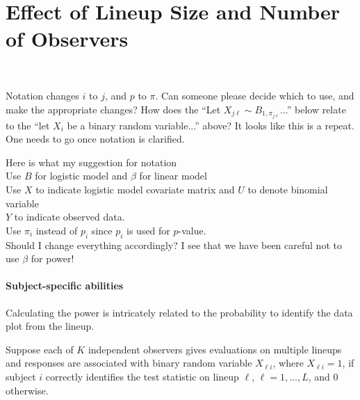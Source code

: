 \documentclass{article}
\newcommand{\red}[1]{{\color{red} #1}}
\newcommand{\green}[1]{{\color{green} #1}} %
\begin{document}
\section{Effect of Lineup Size and Number of Observers}~\label{sec:size}

\green{Notation changes $i$ to $j$, and $p$ to $\pi$. Can someone please decide which to use, and make the appropriate changes? How does the ``Let $X_{j\ell} \sim B_{1, \pi_{j\ell}}$...'' below relate to the ``let $X_i$ be a binary random variable...'' above? It looks like this is a repeat. One needs to go once notation is clarified.}

\red{Here is what my suggestion for notation \\  Use $B$ for logistic model and $\beta$ for linear model \\ Use $X$ to indicate logistic model covariate matrix and $U$ to denote binomial variable \\ $Y$ to indicate observed data. \\ Use $\pi_i$ instead of $p_i$ since $p_i$ is used for $p$-value.  \\ Should I change everything accordingly? I see that we have been careful not to use $\beta$ for power! }

\paragraph{Subject-specific abilities}
Calculating the power  is intricately related to the probability to identify the data plot from the lineup. 

Suppose each of $K$ independent observers gives evaluations on multiple lineups and responses are associated with binary random variable $X_{\ell i}$, where  $X_{\ell i} = 1$, if subject $i$ correctly identifies the test statistic on lineup $\ell$,  $\ell = 1, ..., L$, and 0 otherwise.
\end{document}
